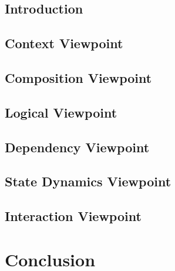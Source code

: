 \documentclass[letterpaper,10pt,draftclsnofoot,onecolumn,titlepage]{IEEEtran}
\begin{document}
		\subsection{Introduction}
		
		\subsection{Context Viewpoint}
		
		\subsection{Composition Viewpoint}
		
		\subsection{Logical Viewpoint}
		
		\subsection{Dependency Viewpoint}
		
		\subsection{State Dynamics Viewpoint}
		
		\subsection{Interaction Viewpoint}
		
	\section{Conclusion}
	
	
\end{document}
